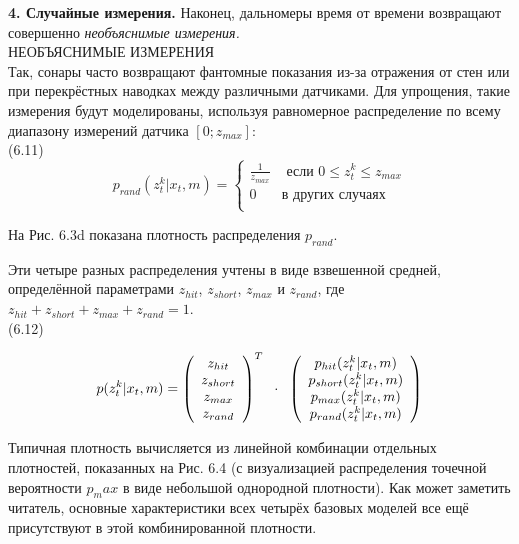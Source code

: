 \documentclass[10pt,a4paper]{article}
\begin{document}
\textbf{4. Случайные измерения.} Наконец, дальномеры время от времени возвращают совершенно \textit{необъяснимые измерения.}\\
НЕОБЪЯСНИМЫЕ 
ИЗМЕРЕНИЯ \\ 
Так, сонары часто возвращают фантомные показания из-за отражения от стен или при перекрёстных наводках между различными датчиками. Для упрощения, такие измерения будут моделированы, используя равномерное распределение по всему диапазону измерений датчика $[0;z_{max}]$:\\

(6.11)
\begin{equation*}
p_{rand}(z_t^k | x_t, m)=\left\{
\begin{array}{ll}
\frac{1}{z_{max}} & \mbox{ если } 0\leq z_t^k\leq z_{max}\\
0 & \mbox{в других случаях}\\
\end{array}
\right.
\end{equation*}

На Рис. 6.3d показана плотность распределения $p_{rand}$.

Эти четыре разных распределения учтены в виде взвешенной средней, определённой параметрами $z_{hit}$, $z_{short}$, $z_{max}$ и $z_{rand}$, где $z_{hit} + z_{short} + z_{max} +z_{rand} = 1$.\\

(6.12)
\begin{minipage}{0.3\textwidth}
	\begin{equation*}
	p(z_t^k|x_t,m)=
	\left(\begin{array}{c}
	z_{hit}\\
	z_{short}\\
	z_{max}\\
	z_{rand}\\
	\end{array}\right)^T
	\hspace{2mm}
	\cdot \hspace{2mm}\left(\begin{array}{c}
	p_{hit}(z_t^k|x_t,m)\\
	p_{short}(z_t^k|x_t,m)\\
	p_{max}(z_t^k|x_t,m)\\
	p_{rand}(z_t^k|x_t,m)\\
	\end{array}\right)
	\end{equation*}
\end{minipage}

Типичная плотность вычисляется из линейной комбинации отдельных плотностей, показанных на Рис. 6.4 (с визуализацией распределения точечной вероятности $p_max$ в виде небольшой однородной плотности). Как может заметить читатель, основные характеристики всех четырёх базовых моделей все ещё присутствуют в этой комбинированной плотности. 
\end{document}

